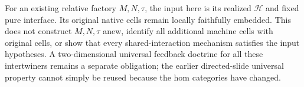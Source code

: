 \documentclass{article}
\begin{document}
For an existing relative factory $M,N,\tau$, the input here is its realized $\mathcal H$ and fixed pure interface. Its original native cells remain locally faithfully embedded. This does not construct $M,N,\tau$ anew, identify all additional machine cells with original cells, or show that every shared-interaction mechanism satisfies the input hypotheses. A two-dimensional universal feedback doctrine for all these intertwiners remains a separate obligation; the earlier directed-slide universal property cannot simply be reused because the hom categories have changed.
\end{document}
